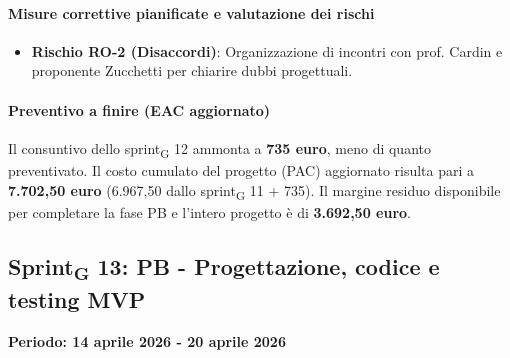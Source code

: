\documentclass[11pt,a4paper]{article}
\newcommand{\gls}[1]{#1\textsubscript{G}}
\begin{document}
\paragraph{Misure correttive pianificate e valutazione dei rischi}
\begin{itemize}
    \item \textbf{Rischio RO-2 (Disaccordi)}: Organizzazione di incontri con prof. Cardin e proponente Zucchetti per chiarire dubbi progettuali.
\end{itemize}

\paragraph{Preventivo a finire (EAC aggiornato)}
Il consuntivo dello \gls{sprint} 12 ammonta a \textbf{735 euro}, meno di quanto preventivato.
Il costo cumulato del progetto (PAC) aggiornato risulta pari a \textbf{7.702,50 euro} (6.967,50 dallo \gls{sprint} 11 + 735). 
Il margine residuo disponibile per completare la fase PB e l'intero progetto è di \textbf{3.692,50 euro}.

\newpage

\subsection{\gls{Sprint} 13: PB - Progettazione, codice e testing MVP}
{\textbf{Periodo: 14 aprile 2026 - 20 aprile 2026}\par}
\end{document}
